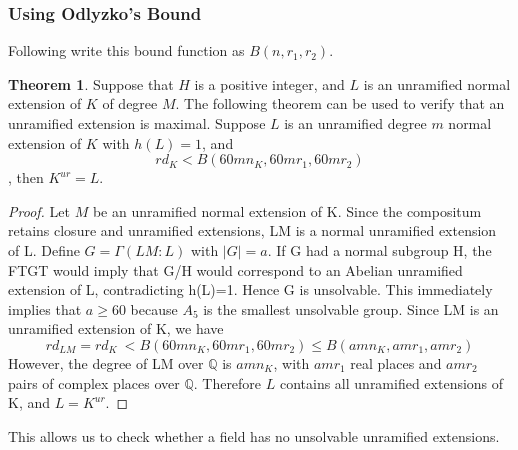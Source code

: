 \documentclass[12pt]{extarticle}
\newcommand{\<}{\langle}
\renewcommand{\>}{\rangle}
\theoremstyle{definition}
\newtheorem{theorem}{Theorem}
\begin{document}
\subsubsection*{Using Odlyzko's Bound}
Following \cite{YAMA1986} write this bound function as $B(n,r_1,r_2)$.
\begin{theorem}
Suppose that $H$ is a positive integer, and $L$ is an unramified normal extension of $K$ of degree $M$. The following theorem can be used to verify that an unramified extension is maximal. Suppose $L$ is an unramified degree $m$  normal extension of $K$ with $h(L)=1$, and 
\begin{equation}
        rd_K<B(60mn_K,60mr_1,60mr_2)
    \end{equation}
, then $K^{ur}=L$.
\end{theorem}
\begin{proof}
Let $M$ be an unramified normal extension of K. Since the compositum retains closure and unramified extensions, LM is a normal unramified extension of L. Define $G=\Gamma(LM:L)$ with $|G|=a$. If G had a normal subgroup H, the FTGT would imply that G/H would correspond to an Abelian unramified extension of L, contradicting h(L)=1. Hence G is unsolvable. This immediately implies that $a\geqslant 60$ because $A_5$ is the 
smallest unsolvable group. Since LM is an unramified extension of K, we have \begin{equation}
    rd_{LM}=rd_{K}\ < B(60mn_K,60mr_1,60mr_2)\leq  B(amn_K,amr_1,amr_2)
\end{equation} 
However, the degree of LM over $\mathbb{Q}$ is $amn_K$, with $amr_1$ real places and $amr_2$ pairs of complex places over $\mathbb{Q}$. Therefore $L$ contains all unramified extensions of K, and $L=K^{ur}$.
\end{proof}
This allows us to check whether a field has no unsolvable unramified extensions. 
\end{document}
